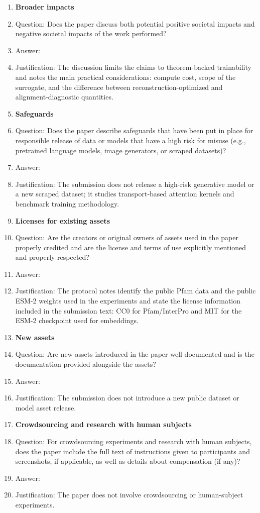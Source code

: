 \begin{enumerate}
\item {\bf Broader impacts}
    \item[] Question: Does the paper discuss both potential positive societal impacts and negative societal impacts of the work performed?
    \item[] Answer: \answerYes{}
    \item[] Justification: The discussion limits the claims to theorem-backed trainability and notes the main practical considerations: compute cost, scope of the surrogate, and the difference between reconstruction-optimized and alignment-diagnostic quantities.

\item {\bf Safeguards}
    \item[] Question: Does the paper describe safeguards that have been put in place for responsible release of data or models that have a high risk for misuse (e.g., pretrained language models, image generators, or scraped datasets)?
    \item[] Answer: \answerNA{}
    \item[] Justification: The submission does not release a high-risk generative model or a new scraped dataset; it studies transport-based attention kernels and benchmark training methodology.

\item {\bf Licenses for existing assets}
    \item[] Question: Are the creators or original owners of assets used in the paper properly credited and are the license and terms of use explicitly mentioned and properly respected?
    \item[] Answer: \answerYes{}
    \item[] Justification: The protocol notes identify the public Pfam data and the public ESM-2 weights used in the experiments and state the license information included in the submission text: CC0 for Pfam/InterPro and MIT for the ESM-2 checkpoint used for embeddings.

\item {\bf New assets}
    \item[] Question: Are new assets introduced in the paper well documented and is the documentation provided alongside the assets?
    \item[] Answer: \answerNA{}
    \item[] Justification: The submission does not introduce a new public dataset or model asset release.

\item {\bf Crowdsourcing and research with human subjects}
    \item[] Question: For crowdsourcing experiments and research with human subjects, does the paper include the full text of instructions given to participants and screenshots, if applicable, as well as details about compensation (if any)?
    \item[] Answer: \answerNA{}
    \item[] Justification: The paper does not involve crowdsourcing or human-subject experiments.


\end{enumerate}
